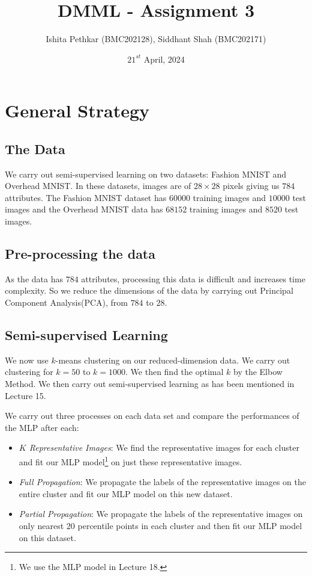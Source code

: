\documentclass[10pt]{article}
\title{DMML - Assignment 3}
\author{Ishita Pethkar (BMC202128), Siddhant Shah (BMC202171)}
\date{$21^{st}$ April, 2024}
\begin{document}
\maketitle
\tableofcontents

\section{General Strategy}

\subsection{The Data}
   We carry out semi-supervised learning on two datasets: Fashion MNIST and Overhead MNIST. In these datasets, images are of $28 \times 28$ pixels giving us $784$ attributes. The Fashion MNIST dataset has $60000$ training images and $10000$ test images and the Overhead MNIST data has $68152$ training images and $8520$ test images.

\subsection{Pre-processing the data}
    As the data has $784$ attributes, processing this data is difficult and increases time complexity. So we reduce the dimensions of the data by carrying out Principal Component Analysis(PCA), from $784$ to $28$.

\subsection{Semi-supervised Learning}
    We now use $k$-means clustering on our reduced-dimension data. We carry out clustering for $k = 50$ to  $k = 1000$. We then find the optimal $k$ by the Elbow Method. We then carry out semi-supervised learning as has been mentioned in Lecture 15. 
    
    We carry out three processes on each data set and compare the performances of the MLP after each:
    \begin{itemize}
        \item \emph{$K$ Representative Images}: We find the representative images for each cluster and fit our MLP model\footnote{We use the MLP model in Lecture 18.} on just these representative images.
        \item \emph{Full Propagation}: We propagate the labels of the representative images on the entire cluster and fit our MLP model on this new dataset.
        \item \emph{Partial Propagation}: We propagate the labels of the representative images on only nearest $20$ percentile points in each cluster and then fit our MLP model on this dataset.
    \end{itemize}
\end{document}
